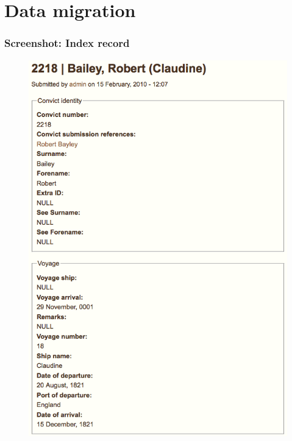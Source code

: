 \documentclass[ignorenonframetext,11pt]{beamer}
\begin{document}
\section{Data migration}
\label{datamigration}

\begin{frame}
\frametitle{Screenshot: Index record}
\label{screenshot:indexrecord}

\begin{figure}
	\label{bailey}
	\begin{center}
	\includegraphics[keepaspectratio,width=\textwidth, height=.75\textheight]{images/2218.png}
	\end{center}
	\end{figure}
	



\end{frame}
		
\end{document}
